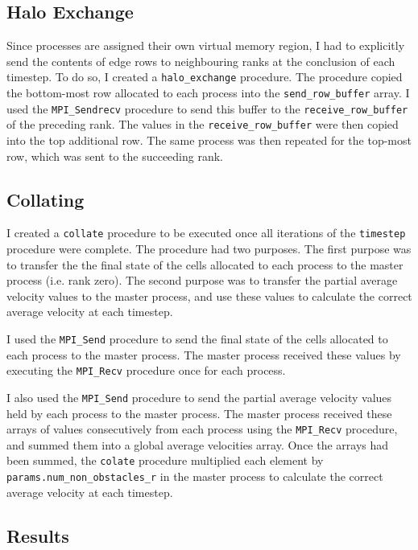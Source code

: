 \documentclass[twocolumn, a4paper]{article}
\begin{document}
\subsection{Halo Exchange}

Since processes are assigned their own virtual memory region, I had to explicitly send the contents of edge rows to neighbouring ranks at the conclusion of each timestep.
To do so, I created a \texttt{halo\_exchange} procedure.
The procedure copied the bottom-most row allocated to each process into the \texttt{send\_row\_buffer} array.
I used the \texttt{MPI\_Sendrecv} procedure to send this buffer to the \texttt{receive\_row\_buffer} of the preceding rank.
The values in the \texttt{receive\_row\_buffer} were then copied into the top additional row.
The same process was then repeated for the top-most row, which was sent to the succeeding rank.

\subsection{Collating}

I created a \texttt{collate} procedure to be executed once all iterations of the \texttt{timestep} procedure were complete.
The procedure had two purposes.
The first purpose was to transfer the the final state of the cells allocated to each process to the master process (i.e. rank zero).
The second purpose was to transfer the partial average velocity values to the master process, and use these values to calculate the correct average velocity at each timestep.

I used the \texttt{MPI\_Send} procedure to send the final state of the cells allocated to each process to the master process.
The master process received these values by executing the \texttt{MPI\_Recv} procedure once for each process.

I also used the \texttt{MPI\_Send} procedure to send the partial average velocity values held by each process to the master process.
The master process received these arrays of values consecutively from each process using the \texttt{MPI\_Recv} procedure, and summed them into a global average velocities array.
Once the arrays had been summed, the \texttt{colate} procedure multiplied each element by \texttt{params.num\_non\_obstacles\_r} in the master process to calculate the correct average velocity at each timestep.

\subsection{Results}
\end{document}
